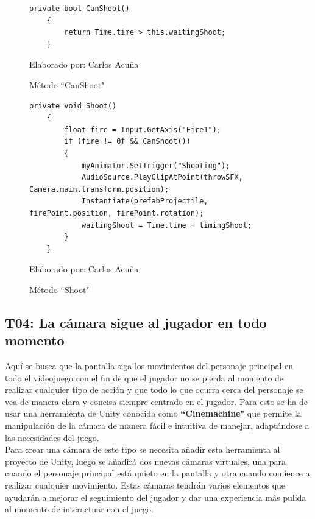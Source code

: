 \documentclass[a4paper, openright, 12pt]{report}
\begin{document}
\begin{itemize}
\begin{figure}[h]
\captionsetup{justification=centering,margin=2cm}
\centering
\lstset{language=C, breaklines=true, basicstyle=\footnotesize}
\lstset{numbers=left, numberstyle=\tiny, stepnumber=1, numbersep=-2pt}
\begin{lstlisting}[frame=single]
  private bool CanShoot()
    {
        return Time.time > this.waitingShoot;
    }
\end{lstlisting}
\caption{Método ``CanShoot"}
Elaborado por: Carlos Acuña
\end{figure}

\begin{figure}[h]
\captionsetup{justification=centering,margin=2cm}
\centering
\lstset{language=C, breaklines=true, basicstyle=\footnotesize}
\lstset{numbers=left, numberstyle=\tiny, stepnumber=1, numbersep=-2pt}
\begin{lstlisting}[frame=single]
  private void Shoot()
    {
        float fire = Input.GetAxis("Fire1");
        if (fire != 0f && CanShoot())
        {
            myAnimator.SetTrigger("Shooting");
            AudioSource.PlayClipAtPoint(throwSFX, Camera.main.transform.position);
            Instantiate(prefabProjectile, firePoint.position, firePoint.rotation);
            waitingShoot = Time.time + timingShoot;
        }
    }
\end{lstlisting}
\caption{Método ``Shoot"}
Elaborado por: Carlos Acuña
\end{figure}
\end{itemize} 
\clearpage
\subsection*{T04: La cámara sigue al jugador en todo momento}
\justify
Aquí se busca que la pantalla siga los movimientos del personaje principal en todo el videojuego con el fin de que el jugador no se pierda al momento de realizar cualquier tipo de acción y que todo lo que ocurra cerca del personaje se vea de manera clara y concisa siempre centrado en el jugador. Para esto se ha de usar una herramienta de Unity conocida como \textbf{``Cinemachine"} que permite la manipulación de la cámara de manera fácil e intuitiva de manejar, adaptándose a las necesidades del juego.\\
Para crear una cámara de este tipo se necesita añadir esta herramienta al proyecto de Unity, luego se añadirá dos nuevas cámaras virtuales, una para cuando el personaje principal está quieto en la pantalla y otra cuando comience a realizar cualquier movimiento. Estas cámaras tendrán varios elementos que ayudarán a mejorar el seguimiento del jugador y dar una experiencia más pulida al momento de interactuar con el juego.
\end{document}
